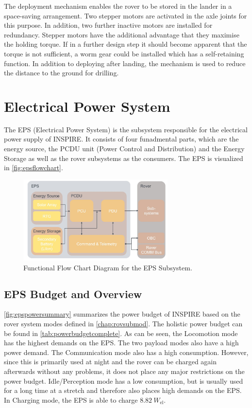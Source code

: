 The deployment mechanism enables the rover to be stored in the lander in a space-saving arrangement. Two stepper motors are activated in the axle joints for this purpose. In addition, two further inactive motors are installed for redundancy. Stepper motors have the additional advantage that they maximise the holding torque. If in a further design step it should become apparent that the torque is not sufficient, a worm gear could be installed which has a self-retaining function. In addition to deploying after landing, the mechanism is used to reduce the distance to the ground for drilling. 


\section{Electrical Power System}
\label{sec:EPS}
The EPS (Electrical Power System) is the subsystem responsible for the electrical power supply of INSPIRE. It consists of four funadmental parts, which are the energy source, the PCDU unit (Power Control and Distribution) and the Energy Storage as well as the rover subsystems as the consumers. The EPS is visualized in \autoref{fig:epsflowchart}.

\begin{figure}[htb]
{\centering
\includegraphics[width=0.7\textwidth]{Media/epsflowchart}
\caption{Functional Flow Chart Diagram for the EPS Subsystem.}
\label{fig:epsflowchart}
}
\end{figure}


\subsection{EPS Budget and Overview}
\autoref{fig:epspowersummary} summarizes the power budget of INSPIRE based on the rover system modes defined in \autoref{chap:rovsubmod}. The holistic power budget can be found in \autoref{tab:powerbudgetcomplete}.
As can be seen, the Locomotion mode has the highest demands on the EPS. The two payload modes also have a high power demand. The Communication mode also has a high consumption. However, since this is primarily used at night and the rover can be charged again afterwards without any problems, it does not place any major restrictions on the power budget. Idle/Perception mode has a low consumption, but is usually used for a long time at a stretch and therefore also places high demands on the EPS. In Charging mode, the EPS is able to charge $8.82 \ W_\text{el} $.


